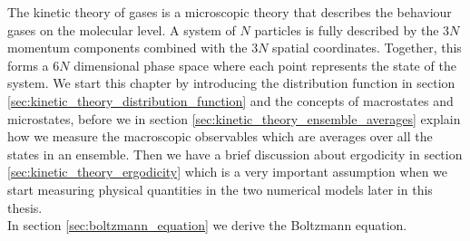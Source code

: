 The kinetic theory of gases is a microscopic theory that describes the behaviour gases on the molecular level. A system of $N$ particles is fully described by the $3N$ momentum components combined with the $3N$ spatial coordinates. Together, this forms a $6N$ dimensional phase space where each point represents the state of the system. We start this chapter by introducing the distribution function in section \ref{sec:kinetic_theory_distribution_function} and the concepts of macrostates and microstates, before we in section \ref{sec:kinetic_theory_ensemble_averages} explain how we measure the macroscopic observables which are averages over all the states in an ensemble. Then we have a brief discussion about ergodicity in section \ref{sec:kinetic_theory_ergodicity} which is a very important assumption when we start measuring physical quantities in the two numerical models later in this thesis.\\
In section \ref{sec:boltzmann_equation} we derive the Boltzmann equation. 

